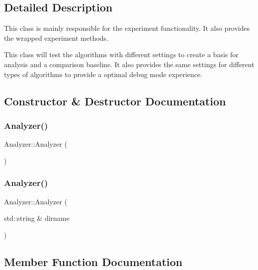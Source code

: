 \subsection{Detailed Description}
This class is mainly responsible for the experiment functionality. It also provides the wrapped experiment methods. 

This class will test the algorithms with different settings to create a basis for analysis and a comparison baseline. It also provides the same settings for different types of algorithms to provide a optimal debug mode experience. 

\subsection{Constructor \& Destructor Documentation}
\mbox{\label{class_analyzer_a1be2ff17bba265bdef6e1b44748eaf96}} 
\subsubsection{\texorpdfstring{Analyzer()}{Analyzer()}\hspace{0.1cm}{\footnotesize\ttfamily [1/2]}}
{\footnotesize\ttfamily Analyzer\+::\+Analyzer (\begin{DoxyParamCaption}{ }\end{DoxyParamCaption})\hspace{0.3cm}{\ttfamily [inline]}}

\mbox{\label{class_analyzer_a2aed8194a48a8385ef271af3bd6fdd42}} 
\subsubsection{\texorpdfstring{Analyzer()}{Analyzer()}\hspace{0.1cm}{\footnotesize\ttfamily [2/2]}}
{\footnotesize\ttfamily Analyzer\+::\+Analyzer (\begin{DoxyParamCaption}\item[{std\+::string \&}]{dirname }\end{DoxyParamCaption})\hspace{0.3cm}{\ttfamily [inline]}}



\subsection{Member Function Documentation}
\mbox{\label{class_analyzer_ae4637e33a985efefebf2a10502be351c}} 
